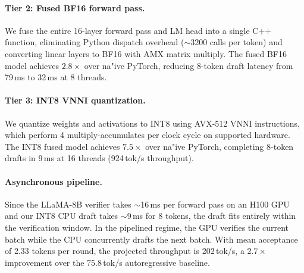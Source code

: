 \paragraph{Tier 2: Fused BF16 forward pass.}
We fuse the entire 16-layer forward pass and LM head into a single C++ function, eliminating Python dispatch overhead ($\sim$3200 calls per token) and converting linear layers to BF16 with AMX matrix multiply.
The fused BF16 model achieves $2.8\times$ over na"ive PyTorch, reducing 8-token draft latency from 79\,ms to 32\,ms at 8 threads.

\paragraph{Tier 3: INT8 VNNI quantization.}
We quantize weights and activations to INT8 using AVX-512 VNNI instructions, which perform 4 multiply-accumulates per clock cycle on supported hardware.
The INT8 fused model achieves $7.5\times$ over na"ive PyTorch, completing 8-token drafts in 9\,ms at 16 threads (924\,tok/s throughput).

\paragraph{Asynchronous pipeline.}
Since the LLaMA-8B verifier takes $\sim$16\,ms per forward pass on an H100 GPU and our INT8 CPU draft takes $\sim$9\,ms for 8 tokens, the draft fits entirely within the verification window.
In the pipelined regime, the GPU verifies the current batch while the CPU concurrently drafts the next batch.
With mean acceptance of 2.33 tokens per round, the projected throughput is 202\,tok/s, a $2.7\times$ improvement over the 75.8\,tok/s autoregressive baseline.
